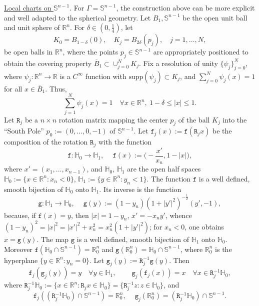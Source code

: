 \documentclass[10pt,reqno,a4paper]{article}
\numberwithin{equation}{section}
\theoremstyle{plain}
\theoremstyle{definition}
\newcommand{\R}{{\mathbb R}}
\renewcommand{\S}{{\mathbb S}}
\begin{document}
\underline{Local charts on $\S^{n-1}$}.
For $\Gamma = \S^{n-1}$, the construction above can be more explicit 
and well adapted to the spherical geometry. 
Let $B_1, \S^{n-1}$ be the open unit ball and unit sphere of $\R^n$. 
For $\delta \in (0, \frac14)$, let 
\[
K_0 = B_{1-\delta}(0), \quad  
K_j = B_{2\delta}(p_j), \quad j = 1, \ldots, N, 
\]
be open balls in $\R^n$,
where the points $p_j \in \S^{n-1}$ are appropriately positioned to obtain the covering property 
$\overline{B}_1 \subset \cup_{j=0}^N K_j$. 
Fix a resolution of unity $\{ \psi_j \}_{j=0}^N$, 
where $\psi_j : \R^n \to \R$ is a $C^\infty$ function with $\mathrm{supp}(\psi_j) \subset K_j$,
and $\sum_{j=0}^N \psi_j(x) = 1$ for all $x \in \overline B_1$. 
Thus,
\begin{equation} \label{res.unity.in.the.annulus}
\sum_{j=1}^N \psi_j(x) = 1 \quad \forall x \in \R^n, \  1-\delta \leq |x| \leq 1.
\end{equation}
Let $\mathtt R_j$ be a $n \times n$ rotation matrix mapping the center $p_j$ of the ball $K_j$ 
into the ``South Pole'' $p_0 := (0, . . . , 0, -1)$ of $\S^{n-1}$.  
Let $\mathtt f_j(x) := \mathtt f(\mathtt R_j x)$ be the composition of the rotation $\mathtt R_j$
with the function 
\begin{equation} \label{explicit.mathtt.f} 
\mathtt f : \mathbb H_0 \to \mathbb H_1, \quad \ 
\mathtt f(x) := \Big( - \frac{x'}{x_n} , 1 - |x| \Big),
\end{equation}
where $x' = (x_1, \ldots, x_{n-1})$, and $\mathbb H_0$, $\mathbb H_1$ 
are the open half spaces 
$\mathbb H_0 := \{ x \in \R^n : x_n < 0 \}$, 
$\mathbb H_1 := \{ y \in \R^n : y_n < 1 \}$.
The function $\mathtt f$ is a well defined, smooth bijection of $\mathbb H_0$ onto $\mathbb H_1$.
Its inverse is the function 
\begin{equation} \label{explicit.mathtt.f.inv}
\mathtt g : \mathbb H_1 \to \mathbb H_0, \quad \ 
\mathtt g(y) := (1 - y_n) (1 + |y'|^2)^{-\frac12} (y', -1),
\end{equation}
because, if $\mathtt f(x) = y$, then $|x| = 1 - y_n$, $x' = - x_n y'$, 
whence $(1-y_n)^2 = |x|^2 = |x'|^2 + x_n^2 = x_n^2(1+|y'|^2)$; 
for $x_n < 0$, one obtains $x = \mathtt g(y)$. 
The map $\mathtt{g}$ is a well defined, smooth bijection of $\mathbb H_1$ onto $\mathbb H_0$. 
Moreover $\mathtt f( \mathbb H_0 \cap \S^{n-1} ) = \R^n_0$ 
and $\mathtt g(\R^n_0) = \mathbb H_0 \cap \S^{n-1}$, where $\R^n_0$ is the hyperplane 
$\{ y \in \R^n : y_n = 0 \}$. 
Let $\mathtt g_j(y) := \mathtt R_j^{-1} \mathtt g(y)$. 
Then 
\begin{equation} \label{inv.large.domain}
\mathtt f_j(\mathtt g_j(y)) = y \quad \forall y \in \mathbb H_1, 
\qquad \ 
\mathtt g_j(\mathtt f_j(x)) = x \quad \forall x \in \mathtt R_j^{-1} \mathbb H_0,
\end{equation}
where $\mathtt R_j^{-1} \mathbb H_0 := \{ x \in \R^n : \mathtt R_j x \in \mathbb H_0 \}
= \{ \mathtt R_j^{-1} z : z \in \mathbb H_0 \}$,
and 
\begin{equation} \label{ttf.ttg.sets}
\mathtt f_j( (\mathtt R_j^{-1} \mathbb H_0) \cap \S^{n-1} ) = \R^n_0, \quad \ 
\mathtt g_j( \R^n_0 ) = (\mathtt R_j^{-1} \mathbb H_0) \cap \S^{n-1}.
\end{equation}
\end{document}
